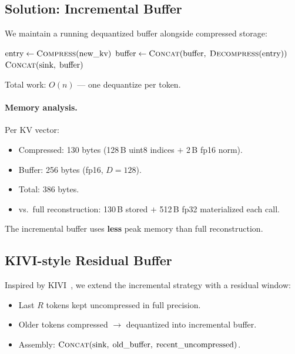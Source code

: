 \documentclass[11pt,a4paper]{article}
\begin{document}
\subsection{Solution: Incremental Buffer}

We maintain a running dequantized buffer alongside compressed storage:

\begin{algorithm}[H]
\caption{Incremental Buffer Reconstruction}
\begin{algorithmic}[1]
  \STATE $\text{entry} \gets \textsc{Compress}(\text{new\_kv})$
  \STATE $\text{buffer} \gets \textsc{Concat}(\text{buffer},\; \textsc{Decompress}(\text{entry}))$ 
  \RETURN $\textsc{Concat}(\text{sink},\; \text{buffer})$
\ENDFOR
\end{algorithmic}
\end{algorithm}

Total work: $O(n)$ --- one dequantize per token.

\paragraph{Memory analysis.} Per KV vector:
\begin{itemize}
  \item Compressed: 130 bytes (128\,B uint8 indices $+$ 2\,B fp16 norm).
  \item Buffer: 256 bytes (fp16, $D=128$).
  \item Total: 386 bytes.
  \item vs.\ full reconstruction: 130\,B stored $+$ 512\,B fp32 materialized each call.
\end{itemize}

The incremental buffer uses \textbf{less} peak memory than full reconstruction.

\subsection{KIVI-style Residual Buffer}

Inspired by KIVI~\cite{yuan2024kivi}, we extend the incremental strategy with a residual window:

\begin{itemize}
  \item Last $R$ tokens kept uncompressed in full precision.
  \item Older tokens compressed $\to$ dequantized into incremental buffer.
  \item Assembly: $\textsc{Concat}(\text{sink},\; \text{old\_buffer},\; \text{recent\_uncompressed})$.
\end{itemize}
\end{document}
